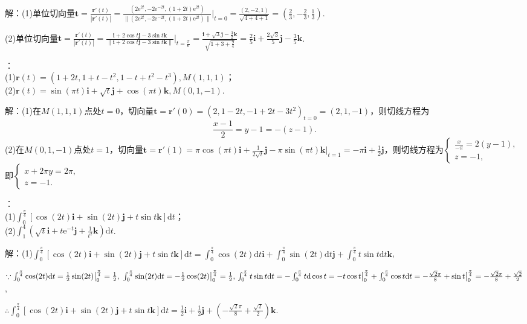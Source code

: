 \documentclass[12pt,UTF8]{ctexart}
\begin{document}
\begin{enumerate}
解：(1)单位切向量$\bm t=\frac{\bm r'(t)}{|\bm r'(t)|}=\frac{(2\mathrm e^{2t},-2\mathrm e^{-2t},(1+2t)\mathrm e^{2t})}{\|(2\mathrm e^{2t},-2\mathrm e^{-2t},(1+2t)\mathrm e^{2t})\|}\Big|_{t=0}=\frac{(2,-2,1)}{\sqrt{4+4+1}}=(\frac23,-\frac23,\frac13)$.

(2)单位切向量$\bm t=\frac{\bm r'(t)}{|\bm r'(t)|}=\frac{\bm i+2\cos t\bm j-3\sin t\bm k}{\|\bm i+2\cos t\bm j-3\sin t\bm k\|}\Big|_{t=\frac\pi6}=\frac{\bm i+\sqrt3\bm j-\frac32\bm k}{\sqrt{1+3+\frac94}}=\frac25\bm i+\frac{2\sqrt3}5\bm j-\frac35\bm k$.

：\\
(1)$\bm r(t)=(1+2t,1+t-t^2,1-t+t^2-t^3),M(1,1,1)$；\\
(2)$\bm r(t)=\sin(\pi t)\bm i+\sqrt t\bm j+\cos(\pi t)\bm k,M(0,1,-1)$.

解：(1)在$M(1,1,1)$点处$t=0$，切向量$\bm t=\bm r'(0)=(2,1-2t,-1+2t-3t^2)_{t=0}=(2,1,-1)$，则切线方程为
\[\frac{x-1}2=y-1=-(z-1).\]
(2)在$M(0,1,-1)$点处$t=1$，切向量$\bm t=\bm r'(1)=\pi\cos(\pi t)\bm i+\frac1{2\sqrt t}\bm j-\pi\sin(\pi t)\bm k\big|_{t=1}=-\pi\bm i+\frac12\bm j$，则切线方程为$\begin{cases}
\frac x{-\pi}=2(y-1),\\
z=-1,
\end{cases}$即$\begin{cases}
x+2\pi y=2\pi,\\
z=-1.
\end{cases}$

：\\
(1)$\int_0^{\frac\pi4}[\cos(2t)\bm i+\sin(2t)\bm j+t\sin t\bm k]\mathrm dt$；\\
(2)$\int_1^4(\sqrt t\bm i+t\mathrm e^{-t}\bm j+\frac1{t^2}\bm k)\mathrm dt$.

解：(1)$\int_0^{\frac\pi4}[\cos(2t)\bm i+\sin(2t)\bm j+t\sin t\bm k]\mathrm dt=\int_0^{\frac\pi4}\cos(2t)\mathrm dt\bm i+\int_0^{\frac\pi4}\sin(2t)\mathrm dt\bm j+\int_0^{\frac\pi4}t\sin t\mathrm dt\bm k$,

$\because\int_0^{\frac\pi4}\cos(2t)\mathrm dt=\frac12\sin(2t)\big|_0^{\frac\pi4}=\frac12,\ \int_0^{\frac\pi4}\sin(2t)\mathrm dt=-\frac12\cos(2t)\big|_0^{\frac\pi4}=\frac12,\\
\int_0^{\frac\pi4}t\sin t\mathrm dt=-\int_0^{\frac\pi4}t\mathrm d\cos t=-t\cos t\big|_0^{\frac\pi4}+\int_0^{\frac\pi4}\cos t\mathrm dt=-\frac{\sqrt2\pi}{8}+\sin t\big|_0^{\frac\pi4}=-\frac{\sqrt2\pi}{8}+\frac{\sqrt2}2$,

$\therefore\int_0^{\frac\pi4}[\cos(2t)\bm i+\sin(2t)\bm j+t\sin t\bm k]\mathrm dt=\frac12\bm i+\frac12\bm j+(-\frac{\sqrt2\pi}{8}+\frac{\sqrt2}2)\bm k$.


\end{enumerate}
\end{document}
